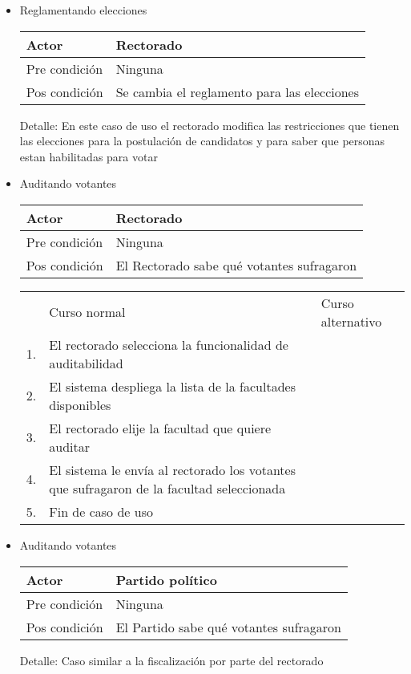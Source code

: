 \begin{itemize}
\bigskip
\item Reglamentando elecciones
\begin{center}
\begin{tabular}{ll}
Actor & Rectorado \\
\hline
Pre condici\'on & Ninguna \\
\hline
Pos condici\'on & Se cambia el reglamento para las elecciones \\
\hline
\end{tabular}
\medskip
Detalle: En este caso de uso el rectorado modifica las restricciones que tienen las elecciones para la postulación de candidatos y para saber que personas estan habilitadas para votar
\end{center}






\bigskip
\item Auditando votantes
\begin{center}
\begin{tabular}{ll}
Actor & Rectorado \\
\hline
Pre condición & Ninguna\\
\hline
Pos condición & El Rectorado sabe qu\'e votantes sufragaron \\
\hline
\end{tabular}
\medskip
\begin{tabular}{c p{4cm}|p{4cm}}
 & Curso normal & Curso alternativo \\
 1. & El rectorado selecciona la funcionalidad de auditabilidad &   \\
 2. & El sistema despliega la lista de la facultades disponibles &   \\
 3. & El rectorado elije la facultad que quiere auditar & \\
 4. & El sistema le env\'ia al rectorado los votantes que sufragaron de la facultad seleccionada \\
 5. & Fin de caso de uso & \\
\end{tabular}
\end{center}  

\bigskip
\item Auditando votantes
\begin{center}
\begin{tabular}{ll}
Actor & Partido político \\
\hline
Pre condición & Ninguna\\
\hline
Pos condición & El Partido sabe qu\'e votantes sufragaron \\
\hline
\end{tabular}
\medskip
Detalle: Caso similar a la fiscalización por parte del rectorado
\end{center} 



\end{itemize}